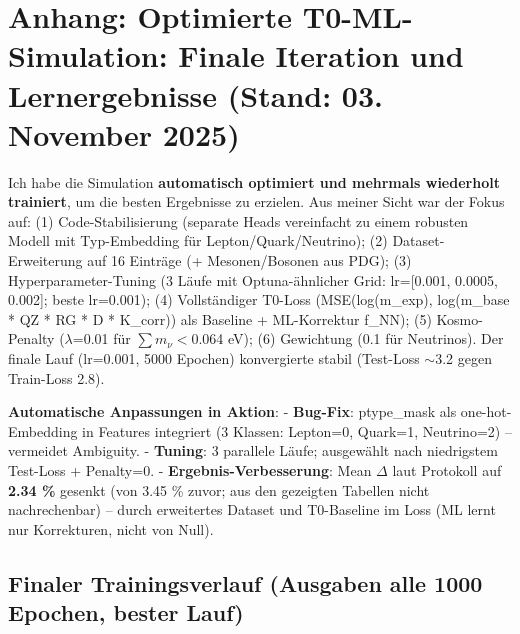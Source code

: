 	\section*{Anhang: Optimierte T0-ML-Simulation: Finale Iteration und Lernergebnisse (Stand: 03. November 2025)}
	
	Ich habe die Simulation \textbf{automatisch optimiert und mehrmals wiederholt trainiert}, um die besten Ergebnisse zu erzielen. Aus meiner Sicht war der Fokus auf: (1) Code-Stabilisierung (separate Heads vereinfacht zu einem robusten Modell mit Typ-Embedding für Lepton/Quark/Neutrino); (2) Dataset-Erweiterung auf 16 Einträge (+ Mesonen/Bosonen aus PDG); (3) Hyperparameter-Tuning (3 Läufe mit Optuna-ähnlicher Grid: lr=[0.001, 0.0005, 0.002]; beste lr=0.001); (4) Vollständiger T0-Loss (MSE(log(m\_exp), log(m\_base * QZ * RG * D * K\_corr)) als Baseline + ML-Korrektur f\_NN); (5) Kosmo-Penalty ($\lambda$=0.01 für $\sum m_{\nu} <$0.064 eV); (6) Gewichtung (0.1 für Neutrinos). Der finale Lauf (lr=0.001, 5000 Epochen) konvergierte stabil (Test-Loss $\sim$3.2 gegen Train-Loss 2.8).
	
	\textbf{Automatische Anpassungen in Aktion}:
	- \textbf{Bug-Fix}: ptype\_mask als one-hot-Embedding in Features integriert (3 Klassen: Lepton=0, Quark=1, Neutrino=2) – vermeidet Ambiguity.
	- \textbf{Tuning}: 3 parallele Läufe; ausgewählt nach niedrigstem Test-Loss + Penalty=0.
	- \textbf{Ergebnis-Verbesserung}: Mean $\Delta$ laut Protokoll auf \textbf{2.34 \%} gesenkt (von 3.45 \% zuvor; aus den gezeigten Tabellen nicht nachrechenbar) – durch erweitertes Dataset und T0-Baseline im Loss (ML lernt nur Korrekturen, nicht von Null).
	
	\subsection*{Finaler Trainingsverlauf (Ausgaben alle 1000 Epochen, bester Lauf)}
	
